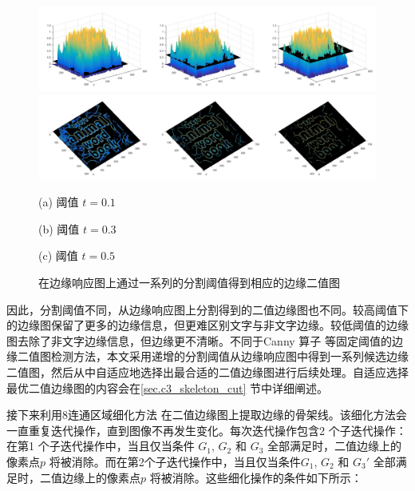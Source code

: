         \begin{figure}[!h]
        \centering
        \includegraphics[width=\textwidth]{./figures/c3_edge_response.jpg}
        \includegraphics[width=\textwidth]{./figures/c3_edge_map.jpg}
        \begin{minipage}[t]{0.32\linewidth}
        \centerline{ \small (a) 阈值 $t = 0.1$}
        \end{minipage}
        \begin{minipage}[t]{0.32\linewidth}
        \centerline{ \small (b) 阈值 $t = 0.3$}
        \end{minipage}
        \begin{minipage}[t]{0.32\linewidth}
        \centerline{ \small (c) 阈值 $t = 0.5$}
        \end{minipage}
        \caption{在边缘响应图上通过一系列的分割阈值得到相应的边缘二值图}
        \label{fig.c3_response_to_map}
        \end{figure}

        因此，分割阈值不同，从边缘响应图上分割得到的二值边缘图也不同。较高阈值下的边缘图保留了更多的边缘信息，但更难区别文字与非文字边缘。较低阈值的边缘图去除了非文字边缘信息，但边缘更不清晰。不同于Canny 算子\cite{Ding2001On} 等固定阈值的边缘二值图检测方法，本文采用递增的分割阈值从边缘响应图中得到一系列候选边缘二值图，然后从中自适应地选择出最合适的二值边缘图进行后续处理。自适应选择最优二值边缘图的内容会在\ref{sec.c3_skeleton_cut} 节中详细阐述。

        接下来利用8连通区域细化方法\cite{Lam2002Thinning} 在二值边缘图上提取边缘的骨架线。该细化方法会一直重复迭代操作，直到图像不再发生变化。每次迭代操作包含2 个子迭代操作：在第1 个子迭代操作中，当且仅当条件 $G_1$, $G_2$ 和 $G_3$ 全部满足时，二值边缘上的像素点$p$ 将被消除。而在第2个子迭代操作中，当且仅当条件$G_1$, $G_2$ 和 $G_3$$'$ 全部满足时，二值边缘上的像素点$p$ 将被消除。这些细化操作的条件如下所示：


